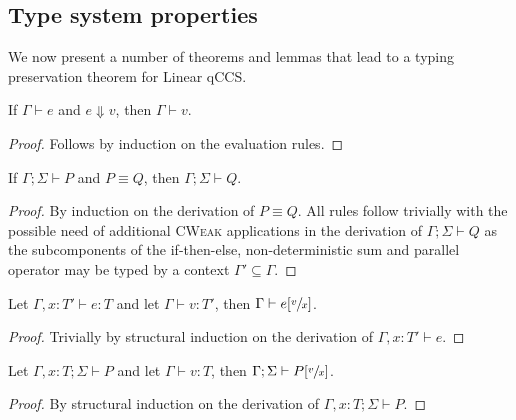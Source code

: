 \subsection{Type system properties}

We now present a number of theorems and lemmas that lead to a typing preservation theorem for Linear qCCS.

\begin{theorem}\label{thm:eval_typing}
  If $\Gamma \vdash e$ and $e \Downarrow v$, then $\Gamma \vdash v$.
\end{theorem}
\begin{proof}
  Follows by induction on the evaluation rules.
\end{proof}

\begin{theorem}
  If $\Gamma; \Sigma \vdash P$ and $P \equiv Q$, then $\Gamma; \Sigma \vdash Q$.
\end{theorem}
\begin{proof}
  By induction on the derivation of $P \equiv Q$. All rules follow trivially with the possible need of additional \textsc{CWeak} applications in the derivation
  of $\Gamma; \Sigma \vdash Q$ as the subcomponents of the if-then-else, non-deterministic sum and parallel operator may be typed by a context $\Gamma' \subseteq \Gamma$.
\end{proof}


\begin{lemma}
  Let $\Gamma, x : T' \vdash e : T$ and let $\Gamma \vdash v : T'$, then $\Gamma \vdash e[\sfrac{v}{x}]$.
\end{lemma}
\begin{proof}
  Trivially by structural induction on the derivation of $\Gamma, x : T' \vdash e$.
\end{proof}

\begin{theorem}
  Let $\Gamma, x : T; \Sigma \vdash P$ and let $\Gamma \vdash v : T$, then $\Gamma; \Sigma \vdash P[\sfrac{v}{x}]$.
\end{theorem}
\begin{proof}
  By structural induction on the derivation of $\Gamma, x : T; \Sigma \vdash P$.
\end{proof}

